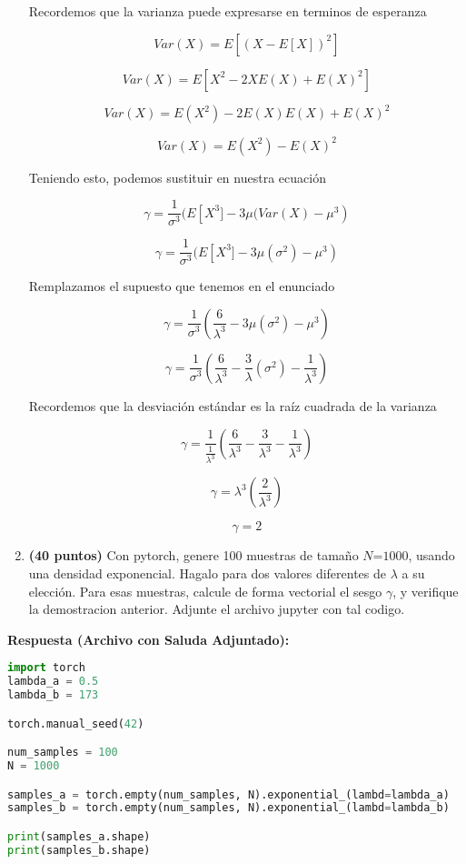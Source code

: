 \documentclass{article}
\begin{document}
\begin{enumerate}
\par Recordemos que la varianza puede expresarse en terminos de esperanza 

\[
Var(X) =  E[(X - E[X])^2]
\]


\[
Var(X) =  E[X^2 - 2XE(X) + E(X)^2]
\]

\[
Var(X) =  E(X^2) - 2E(X)E(X) + E(X)^2
\]


\[
Var(X) =  E(X^2) - E(X)^2
\]

\par Teniendo esto, podemos sustituir en nuestra ecuación

\[
\gamma = \frac{1}{\sigma^3}    ( E\left[ X^3] - 3\mu(Var(X) - \mu^3  \right)
\]


\[
\gamma = \frac{1}{\sigma^3}    ( E\left[ X^3] - 3\mu(\sigma^2) - \mu^3   \right)
\]

\par Remplazamos el supuesto que tenemos en el enunciado

\[
\gamma = \frac{1}{\sigma^3}    ( \frac{6}{\lambda^3} - 3\mu(\sigma^2) - \mu^3)
\]

\[
\gamma = \frac{1}{\sigma^3}    ( \frac{6}{\lambda^3} - \frac{3}{\lambda}(\sigma^2) - \frac{1}{\lambda^3})
\]

\par Recordemos que la desviación estándar es la raíz cuadrada de la varianza  

\[
\gamma = \frac{1}{\frac{1}{\lambda^3}  }    ( \frac{6}{\lambda^3} - \frac{3}{\lambda^3} - \frac{1}{\lambda^3})
\]


\[
\gamma = \lambda^3   ( \frac{2}{\lambda^3})
\]

\[
\gamma = 2
\]
\item \textbf{(40 puntos)} Con pytorch, genere 100 muestras de tamaño $N\text{=1000}$,
usando una densidad exponencial. Hagalo para dos valores diferentes
de $\lambda$ a su elección. Para esas muestras, calcule de forma
vectorial el sesgo $\gamma$, y verifique la demostracion anterior.
Adjunte el archivo jupyter con tal codigo. 
\end{enumerate}

\par \textbf{Respuesta (Archivo con Saluda Adjuntado):} 

\begin{lstlisting}[language=Python, caption=Creación de Muestras]
import torch
lambda_a = 0.5 
lambda_b = 173

torch.manual_seed(42)

num_samples = 100
N = 1000

samples_a = torch.empty(num_samples, N).exponential_(lambd=lambda_a)
samples_b = torch.empty(num_samples, N).exponential_(lambd=lambda_b)

print(samples_a.shape)
print(samples_b.shape)

\end{lstlisting}
\end{document}
